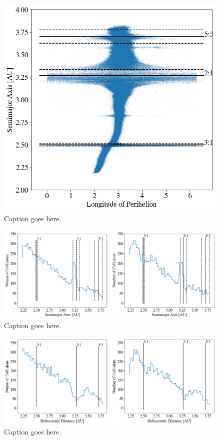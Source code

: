 \documentclass[twocolumn]{aastex63}
\begin{document}
\begin{figure}
    \includegraphics[width=\columnwidth]{figures/long_ph.png}
    \caption{Caption goes here.\label{fig:long_ph}}
\end{figure}

\begin{figure}
    \includegraphics[width=\textwidth]{figures/coll_hist_a.png}
    \caption{Caption goes here.\label{fig:coll_hist_a}}
\end{figure}

\begin{figure}
    \includegraphics[width=\textwidth]{figures/coll_hist_r.png}
    \caption{Caption goes here.\label{fig:coll_hist_r}}
\end{figure}
\end{document}

